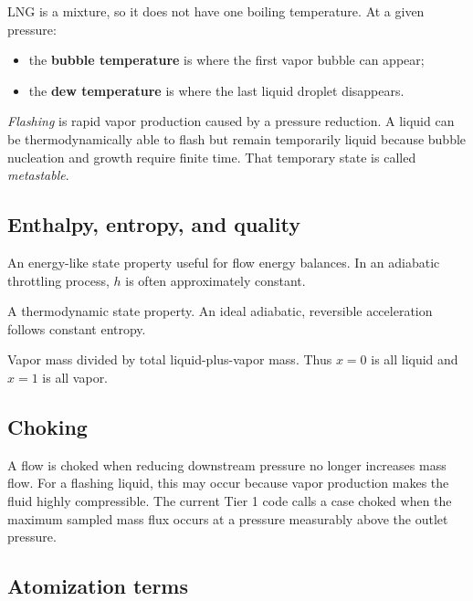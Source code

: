 \documentclass[11pt]{article}
\begin{document}
LNG is a mixture, so it does not have one boiling temperature. At a given pressure:

\begin{itemize}
  \item the \textbf{bubble temperature} is where the first vapor bubble can appear;
  \item the \textbf{dew temperature} is where the last liquid droplet disappears.
\end{itemize}

\emph{Flashing} is rapid vapor production caused by a pressure reduction. A liquid
can be thermodynamically able to flash but remain temporarily liquid because bubble
nucleation and growth require finite time. That temporary state is called
\emph{metastable}.

\subsection{Enthalpy, entropy, and quality}

\begin{description}[style=nextline]
  \item[Specific enthalpy $h$ (J/kg)] An energy-like state property useful for flow
  energy balances. In an adiabatic throttling process, $h$ is often approximately
  constant.
  \item[Specific entropy $s$ (J/(kg K))] A thermodynamic state property. An ideal
  adiabatic, reversible acceleration follows constant entropy.
  \item[Vapor quality $x$] Vapor mass divided by total liquid-plus-vapor mass. Thus
  $x=0$ is all liquid and $x=1$ is all vapor.
\end{description}

\subsection{Choking}

A flow is choked when reducing downstream pressure no longer increases mass flow.
For a flashing liquid, this may occur because vapor production makes the fluid highly
compressible. The current Tier 1 code calls a case choked when the maximum sampled
mass flux occurs at a pressure measurably above the outlet pressure.

\subsection{Atomization terms}
\end{document}
